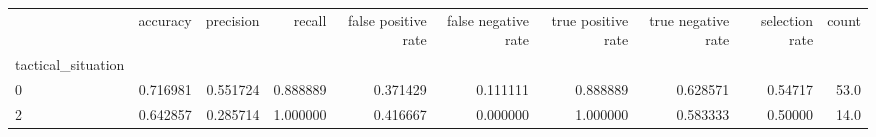 \begin{tabular}{lrrrrrrrrr}
\toprule
{} &  accuracy &  precision &    recall &  false positive rate &  false negative rate &  true positive rate &  true negative rate &  selection rate &  count \\
tactical\_situation &           &            &           &                      &                      &                     &                     &                 &        \\
\midrule
0                  &  0.716981 &   0.551724 &  0.888889 &             0.371429 &             0.111111 &            0.888889 &            0.628571 &         0.54717 &   53.0 \\
2                  &  0.642857 &   0.285714 &  1.000000 &             0.416667 &             0.000000 &            1.000000 &            0.583333 &         0.50000 &   14.0 \\
\bottomrule
\end{tabular}
